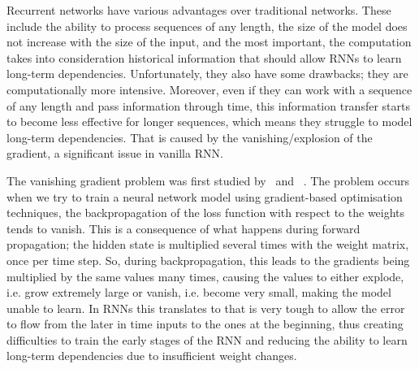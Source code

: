 Recurrent networks have various advantages over traditional networks. These include the ability to process sequences of any length, the size of the model does not increase with the size of the input, and the most important, the computation takes into consideration historical information that should allow RNNs to learn long-term dependencies. Unfortunately, they also have some drawbacks; they are computationally more intensive. Moreover, even if they can work with a sequence of any length and pass information through time, this information transfer starts to become less effective for longer sequences, which means they struggle to model long-term dependencies. That is caused by the vanishing/explosion of the gradient, a significant issue in vanilla RNN. 

The vanishing gradient problem was first studied by~\cite{Hochreiter:91} and ~\cite{bengio1994vanishing}. The problem occurs when we try to train a neural network model using gradient-based optimisation techniques, the backpropagation of the loss function with respect to the weights tends to vanish. This is a consequence of what happens during forward propagation; the hidden state is multiplied several times with the weight matrix, once per time step. So, during backpropagation, this leads to the gradients being multiplied by the same values many times, causing the values to either explode, i.e. grow extremely large or vanish, i.e. become very small, making the model unable to learn. In RNNs this translates to that is very tough to allow the error to flow from the later in time inputs to the ones at the beginning, thus creating difficulties to train the early stages of the RNN and reducing the ability to learn long-term dependencies due to insufficient weight changes.



